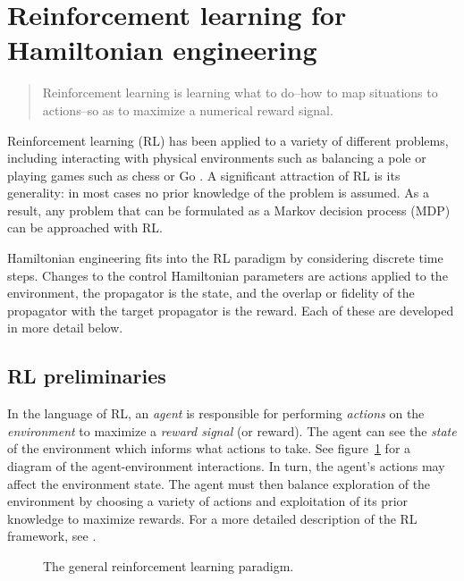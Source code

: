 \documentclass[twocolumn, aps, 10pt]{revtex4-2}
\begin{document}
\section{Reinforcement learning for Hamiltonian engineering}


\begin{quote}
    Reinforcement learning is learning what to do--how to map situations to actions--so as to maximize a numerical reward signal. \cite{sutton2018reinforcement}
\end{quote}
Reinforcement learning  (RL) has been applied to a variety of different problems, including interacting with physical environments such as balancing a pole \cite{lillicrap2015continuous} or playing games such as chess or Go \cite{Silver1140}. A significant attraction of RL is its generality: in most cases no prior knowledge of the problem is assumed. As a result, any problem that can be formulated as a Markov decision process (MDP) can be approached with RL.

Hamiltonian engineering fits into the RL paradigm by considering discrete time steps. Changes to the control Hamiltonian parameters are actions applied to the environment, the propagator is the state, and the overlap or fidelity of the propagator with the target propagator is the reward.  Each of these are developed in more detail below.

\subsection{RL preliminaries}

In the language of RL, an \emph{agent} is responsible for performing \emph{actions} on the \emph{environment} to maximize a \emph{reward signal} (or reward). The agent can see the \emph{state} of the environment which informs what actions to take. See figure~\ref{fig:RL} for a diagram of the agent-environment interactions. In turn, the agent's actions may affect the environment state. The agent must then balance exploration of the environment by choosing a variety of actions and exploitation of its prior knowledge to maximize rewards.
For a more detailed description of the RL framework, see \cite{sutton2018reinforcement}.

\begin{figure}
    \centering
    \caption{The general reinforcement learning paradigm.}
    \label{fig:RL}
\end{figure}
\end{document}
